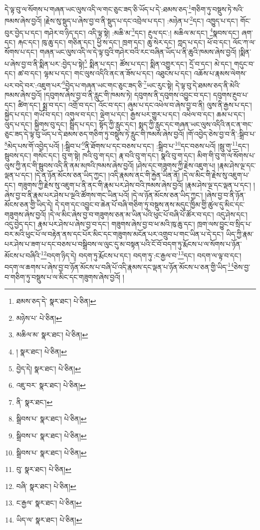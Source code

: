 དེ་ལྟ་བུ་ལ་སོགས་པ་གཞན་ཡང་ལུས་འདི་ལ་གང་ཅུང་ཟད་ཅི་ཡོད་པ་དེ་:ཐམས་ཅད་\footnote{ཐམས་ཅད་དེ་  སྣར་ཐང་།  པེ་ཅིན། }གཅིག་ཏུ་བསྡུས་ཏེ་སའི་ཁམས་ཞེས་བྱའོ། །རྗེས་སུ་སྡུད་པ་ཞེས་བྱ་བ་ནི་སྡུད་པ་དང་འབྲེལ་པ་དང་། :མཉེན་པ་\footnote{མཉེས་པ་  པེ་ཅིན། }དང་། འཁྱུད་པ་དང་། གོང་བུར་བྱེད་པ་དང་། གཤེར་བ་ཉིད་དང་། འདི་ལྟ་སྟེ། :མཆི་མ་\footnote{མཆིལ་མ་  སྣར་ཐང་།  པེ་ཅིན། }དང་། རྔུལ་དང་:། མཆིལ་མ་དང་། \footnote{།    སྣར་ཐང་།  པེ་ཅིན། }སྣབས་དང་། ཞག་དང་། རྐང་དང་། ཁུ་ཆུ་དང་། གཅིན་དང་། ཕྱི་ས་དང་། ཁྲག་དང་། ཆུ་སེར་དང་། ཀླད་པ་དང་། ཕོ་བ་དང་། ལོང་ཀ་ལ་སོགས་པ་དང་། གཞན་ཡང་ལུས་འདི་ལ་དེ་ལྟ་བུའི་གཤེར་བའི་རང་བཞིན་ཡོད་པ་ནི་ཆུའི་ཁམས་ཞེས་བྱའོ། །སྨིན་པ་ཞེས་བྱ་བ་ནི་སྨིན་པར་:བྱེད་པ་སྟེ།\footnote{བྱེད་དེ།  སྣར་ཐང་།  པེ་ཅིན། } སྨིན་པ་དང་། ཚོས་པ་དང་། སྨིན་འགྱུར་དང་། དྲོ་བ་དང་། མེ་དང་། གདུང་བ་དང་། ཚ་བ་དང་། ལྷམ་པ་དང་། གང་ལུས་འདིའི་ནང་ན་ཟོས་པ་དང་། འཐུངས་པ་དང་། འཆོས་པ་རྣམས་ལེགས་པར་བདེ་བར་:འཇུག་པར་\footnote{འཇུ་བར་  སྣར་ཐང་།  པེ་ཅིན། }བྱེད་པ་གཞན་ཡང་གང་ཅུང་ཟད་ཅི་\footnote{ནི་  སྣར་ཐང་། }ཡང་རུང་སྟེ། དེ་ལྟ་བུ་དེ་ཐམས་ཅད་ནི་མེའི་ཁམས་ཞེས་བྱའོ། །དབུགས་ཞེས་བྱ་བ་ནི་རླུང་གི་ཁམས་ཏེ། དབུགས་ནི་དབུགས་འབྱུང་བ་དང་། དབུགས་རྔུབ་པ་དང་། ཚིག་དང་། སྨྲ་བ་དང་། འགྲོ་བ་དང་། འོང་བ་དང་། ཞུམ་པ་དང་འཕེལ་བ་ཞེས་བྱ་བ་ནི། ལུས་ནི་རྒྱས་པ་དང་། སྐྱེད་པ་དང་། གཡོ་བ་དང་། འགུལ་བ་དང་། ལྡེག་པ་དང་། རྒྱས་པར་གྱུར་པ་དང་། འཕེལ་བ་དང་། ཆམ་པ་དང་། ལུད་པ་དང་། སྐྱིགས་བུ་དང་། སྦྲིད་པ་དང་། སྟོད་ཀྱི་རླུང་དང་། སྨད་ཀྱི་རླུང་དང་གཞན་ཡང་ལུས་འདིའི་ནང་ན་གང་ཅུང་ཟད་དེ་ལྟ་བུ་ཡོད་པ་དེ་ཐམས་ཅད་གཅིག་ཏུ་བསྡུས་ཏེ་རླུང་གི་ཁམས་ཞེས་བྱའོ། །གོ་འབྱེད་ཅེས་བྱ་བ་ནི་:སྒྲིབ་པ་\footnote{སྒྲིབས་པ་  སྣར་ཐང་།  པེ་ཅིན། }མེད་པས་གོ་འབྱེད་པའོ། །:སྒྲིབ་པ་\footnote{སྒྲིབས་པ་  སྣར་ཐང་།  པེ་ཅིན། }ནི་ཐོགས་པ་དང་བཅས་པ་དང་། :སྒྲིབ་པ་\footnote{སྒྲིབས་པ་  སྣར་ཐང་།  པེ་ཅིན། }དང་བཅས་པའོ། །སྦུ་གུ་\footnote{བུ་  སྣར་ཐང་།  པེ་ཅིན། }དང་། སྦུབས་དང་། གསེང་དང་། བུ་ག་སྟེ། ཁའི་བུ་ག་དང་། རྣ་བའི་བུ་ག་དང་། སྣའི་བུ་ག་དང་། མིག་གི་བུ་ག་ལ་སོགས་པ་ལུས་ཀྱི་ནང་གི་སྦུབས་འདི་ནི་ནམ་མཁའི་ཁམས་ཞེས་བྱའོ། །ཤེས་དང་གཟུགས་ཀྱི་རྗེས་འཇུག་པ། །རྣམ་ཤེས་ལྔ་དང་ལྡན་པ་དང་། །དེ་ན་ཉོན་མོངས་ཅན་ཡིད་ཀྱང་། །འདི་རྣམས་ནང་གི་རྐྱེན་ཡིན་ནོ། །དེ་ལ་མིང་གི་རྗེས་སུ་འཇུག་པ་དང་། གཟུགས་ཀྱི་རྗེས་སུ་འཇུག་པ་ནི་ནང་གི་རྣམ་པར་ཤེས་བའི་ཁམས་ཞེས་བྱའོ། །རྣམ་ཤེས་ལྔ་དང་ལྡན་པ་དང་། །ཞེས་བྱ་བ་ནི་རྣམ་པར་ཤེས་པ་ལྔའི་ཚོགས་གང་ཡིན་པའོ། །དེ་ལ་ཉོན་མོངས་ཅན་ཡིད་ཀྱང་། །ཞེས་བྱ་བ་ནི་ཉོན་མོངས་ཅན་གྱི་ཡིད་དེ། དེ་དག་དང་འབྱུང་བ་ཆེན་པོ་བཞི་གཅིག་ཏུ་བསྡུས་ནས་མདུང་ཁྱིམ་གྱི་ཚུལ་དུ་མིང་དང་གཟུགས་ཞེས་བྱའོ། །དེ་ལ་མིང་ཞེས་བྱ་བ་གཟུགས་ཅན་མ་ཡིན་པའི་ཕུང་པོ་བཞི་པོ་ཚོར་བ་དང་། འདུ་ཤེས་དང་། འདུ་བྱེད་དང་། རྣམ་པར་ཤེས་པ་ཞེས་བྱ་བ་དང་། གཟུགས་ཞེས་བྱ་བ་ཕ་མའི་ཁུ་ཆུ་དང་། ཁྲག་ལས་བྱུང་བ་སྲིད་པ་བར་མའི་ཕུང་པོ་ལ་བརྟེན་ནས་དང་པོར་མིང་དང་གཟུགས་མངོན་པར་འགྲུབ་པ་གང་ཡིན་པ་དེ་དང་། ཡིད་ཀྱི་རྣམ་པར་ཤེས་པ་ཟག་པ་དང་བཅས་པ་བསྒྲིབས་ལ་ལུང་དུ་མ་བསྟན་པའི་ངོ་བོ་བདག་ཏུ་རྨོངས་པ་ལ་སོགས་པ་ཉོན་མོངས་པ་བཞིའི་\footnote{བཞི་  སྣར་ཐང་།  པེ་ཅིན། }བདག་ཉིད་དེ། བདག་ཏུ་རྨོངས་པ་དང་། བདག་ཏུ་:ང་རྒྱལ་བ་\footnote{ང་རྒྱལ་  སྣར་ཐང་།  པེ་ཅིན། }དང་། བདག་ལ་ལྟ་བ་དང་། བདག་ལ་ཆགས་པ་ཞེས་བྱ་བ་ཉོན་མོངས་པ་བཞི་པོ་འདི་རྣམས་དང་ལྡན་པ་ཉོན་མོངས་པ་ཅན་གྱི་ཡིད་\footnote{ཡིད་ལ་  སྣར་ཐང་།  པེ་ཅིན། }ཅེས་བྱ་བ་གཅིག་ཏུ་བསྡུས་པ་ལ་མིང་དང་གཟུགས་ཞེས་བྱའོ། །
